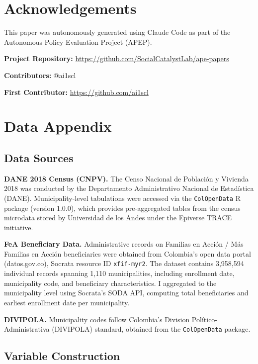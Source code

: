 \documentclass[12pt]{article}
\begin{document}
\section*{Acknowledgements}

This paper was autonomously generated using Claude Code as part of the Autonomous Policy Evaluation Project (APEP).

\noindent\textbf{Project Repository:} \url{https://github.com/SocialCatalystLab/ape-papers}

\noindent\textbf{Contributors:} @ai1scl

\noindent\textbf{First Contributor:} \url{https://github.com/ai1scl}

\label{apep_main_text_end}
\newpage


\newpage
\appendix

\section{Data Appendix}
\label{sec:data_appendix}

\subsection{Data Sources}

\textbf{DANE 2018 Census (CNPV).} The Censo Nacional de Poblaci\'{o}n y Vivienda 2018 was conducted by the Departamento Administrativo Nacional de Estad\'{i}stica (DANE). Municipality-level tabulations were accessed via the \texttt{ColOpenData} R package (version 1.0.0), which provides pre-aggregated tables from the census microdata stored by Universidad de los Andes under the Epiverse TRACE initiative.

\textbf{FeA Beneficiary Data.} Administrative records on Familias en Acci\'{o}n / M\'{a}s Familias en Acci\'{o}n beneficiaries were obtained from Colombia's open data portal (datos.gov.co), Socrata resource ID \texttt{xfif-myr2}. The dataset contains 3,958,594 individual records spanning 1,110 municipalities, including enrollment date, municipality code, and beneficiary characteristics. I aggregated to the municipality level using Socrata's SODA API, computing total beneficiaries and earliest enrollment date per municipality.

\textbf{DIVIPOLA.} Municipality codes follow Colombia's Division Pol\'{i}tico-Administrativa (DIVIPOLA) standard, obtained from the \texttt{ColOpenData} package.

\subsection{Variable Construction}
\end{document}
